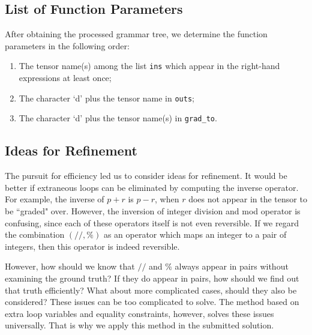 \documentclass[a4paper,11pt]{article}
\begin{document}
	\subsection{List of Function Parameters}
	After obtaining the processed grammar tree, we determine the function parameters in the following order:
	\begin{enumerate}
		\item The tensor name(s) among the list \texttt{ins} which appear in the right-hand expressions at least once;
		\item The character `d' plus the tensor name in \texttt{outs};
		\item The character `d' plus the tensor name(s) in \texttt{grad\_to}.
	\end{enumerate}
	\subsection{Ideas for Refinement}
	The pursuit for efficiency led us to consider ideas for refinement. It would be better if extraneous loops can be eliminated by computing the inverse operator. For example, the inverse of $p+r$ is $p-r$, when $r$ does not appear in the tensor to be ``graded" over. However, the inversion of integer division and mod operator is confusing, since each of these operators itself is not even reversible. If we regard the combination $(//,\%)$ as an operator which maps an integer to a pair of integers, then this operator is indeed reversible. \par 
	However, how should we know that $//$ and $\%$ always appear in pairs without examining the ground truth? If they do appear in pairs, how should we find out that truth efficiently? What about more complicated cases, should they also be considered? These issues can be too complicated to solve. The method based on extra loop variables and equality constraints, however, solves these issues universally. That is why we apply this method in the submitted solution.
\end{document}
